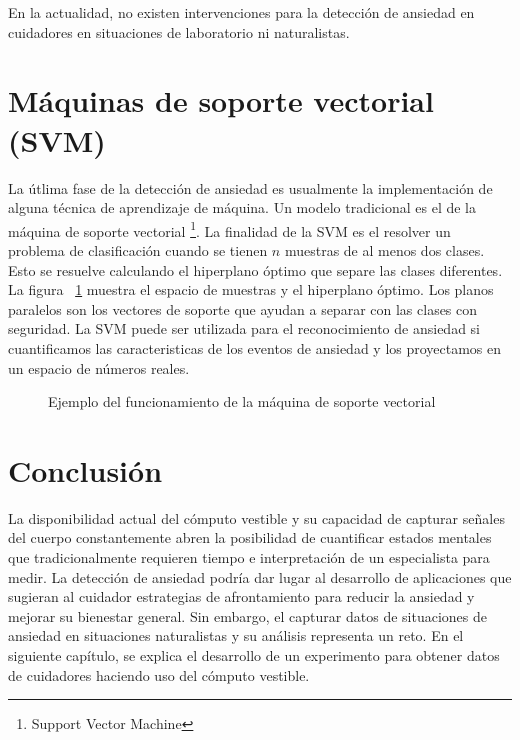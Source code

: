 En la actualidad, no existen intervenciones para la detecci\'on de ansiedad en cuidadores en situaciones de laboratorio ni naturalistas.
\section{M\'aquinas de soporte vectorial (SVM)}
La \'utlima fase de la detecci\'on de ansiedad es usualmente la implementaci\'on de alguna t\'ecnica de aprendizaje de m\'aquina. Un modelo tradicional es el de la m\'aquina de soporte vectorial \footnote{Support Vector Machine}. La finalidad de la SVM es el resolver un problema de clasificaci\'on cuando se tienen $n$ muestras de al menos dos clases. Esto se resuelve calculando el hiperplano \'optimo que separe las clases diferentes. La figura ~\ref{fig:svm} muestra el espacio de muestras y el hiperplano \'optimo. Los planos paralelos son los vectores de soporte que ayudan a separar con las clases con seguridad. La SVM puede ser utilizada para el reconocimiento de ansiedad si cuantificamos las caracteristicas de los eventos de ansiedad y los proyectamos en un espacio de n\'umeros reales.
\begin{figure}[h]
	\centering
	\caption{Ejemplo del funcionamiento de la m\'aquina de soporte vectorial} \label{fig:svm}
\end{figure}

\section{Conclusi\'on}\label{secc:conclution}
La disponibilidad actual del c\'omputo vestible y su capacidad de capturar se\~nales del cuerpo constantemente abren la posibilidad de cuantificar estados mentales que tradicionalmente requieren tiempo e interpretaci\'on de un especialista para medir. La detecci\'on de ansiedad podr\'ia dar lugar al desarrollo de aplicaciones que sugieran al cuidador estrategias de afrontamiento para reducir la ansiedad y mejorar su bienestar general. Sin embargo, el capturar datos de situaciones de ansiedad en situaciones naturalistas y su an\'alisis representa un reto. En el siguiente cap\'itulo, se explica el desarrollo de un experimento para obtener datos de cuidadores haciendo uso del c\'omputo vestible.
\newpage
